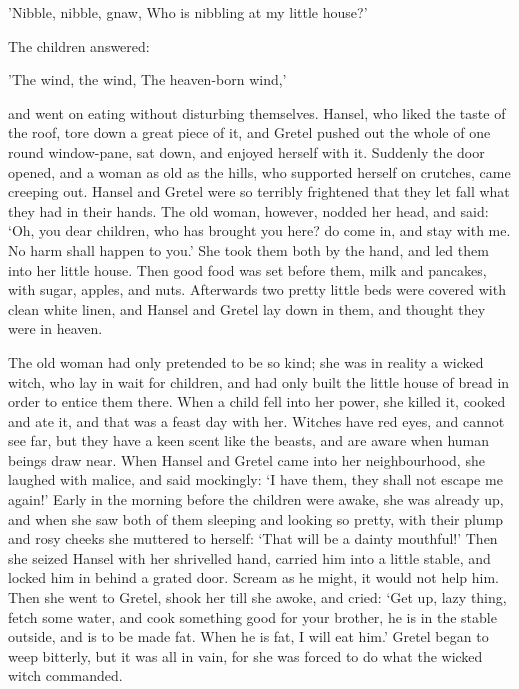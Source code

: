 \documentclass[oneside,11pt]{book} %
\begin{document}
'Nibble, nibble, gnaw,
Who is nibbling at my little house?'

The children answered:

'The wind, the wind,
The heaven-born wind,'

and went on eating without disturbing themselves. Hansel, who liked the taste of the roof, tore down a great piece of it, and Gretel pushed out the whole of one round window-pane, sat down, and enjoyed herself with it. Suddenly the door opened, and a woman as old as the hills, who supported herself on crutches, came creeping out. Hansel and Gretel were so terribly frightened that they let fall what they had in their hands. The old woman, however, nodded her head, and said: `Oh, you dear children, who has brought you here? do come in, and stay with me. No harm shall happen to you.' She took them both by the hand, and led them into her little house. Then good food was set before them, milk and pancakes, with sugar, apples, and nuts. Afterwards two pretty little beds were covered with clean white linen, and Hansel and Gretel lay down in them, and thought they were in heaven.

The old woman had only pretended to be so kind; she was in reality a wicked witch, who lay in wait for children, and had only built the little house of bread in order to entice them there. When a child fell into her power, she killed it, cooked and ate it, and that was a feast day with her. Witches have red eyes, and cannot see far, but they have a keen scent like the beasts, and are aware when human beings draw near. When Hansel and Gretel came into her neighbourhood, she laughed with
malice, and said mockingly: `I have them, they shall not escape me again!' Early in the morning before the children were awake, she was already up, and when she saw both of them sleeping and looking so pretty, with their plump and rosy cheeks she muttered to herself: `That will be a dainty mouthful!' Then she seized Hansel with her shrivelled hand, carried him into a little stable, and locked him in behind a grated door. Scream as he might, it would not help him. Then she went to
Gretel, shook her till she awoke, and cried: `Get up, lazy thing, fetch some water, and cook something good for your brother, he is in the stable outside, and is to be made fat. When he is fat, I will eat him.' Gretel began to weep bitterly, but it was all in vain, for she was forced to do what the wicked witch commanded.
\end{document}
